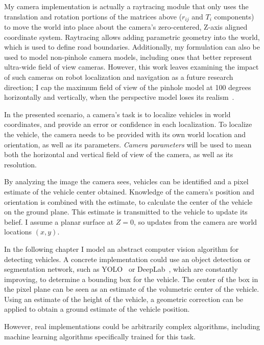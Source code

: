 \documentclass[a4paper,12pt,twoside,openright]{report}
\begin{document}
My camera implementation is actually a raytracing module that only uses the
translation and rotation portions of the matrices above ($r_{ij}$ and $T_i$ components) to
move the world into place about the camera's zero-centered, Z-axis aligned coordinate system. Raytracing
allows adding parametric geometry into the world, which is used to define road boundaries. 
Additionally, my formulation can also be used to model non-pinhole camera models,
including ones that better represent ultra-wide field of view cameras. However, this work leaves
examining the impact of such cameras on robot localization and navigation as
a future research direction; I cap the maximum field of view of the pinhole model
at 100 degrees horizontally and vertically, when the perspective model
loses its realism~\cite{fleckperspective}.

In the presented scenario, a camera's task is to localize vehicles in world coordinates, and
provide an error or confidence in each localization. To localize the vehicle, the camera needs to
be provided with its own world location and orientation, as well as its parameters.
\textit{Camera parameters} will be used to mean both the horizontal
and vertical field of view of the camera, as well as its resolution. 

By analyzing the image the camera sees, vehicles can be identified and a 
pixel estimate of the vehicle center obtained. Knowledge of the camera's position
and orientation is combined with the estimate, to calculate the center of the vehicle
on the ground plane. This estimate is transmitted to the vehicle to update its
belief. I assume a planar surface at $Z = 0$, so updates from the camera
are world locations $(x,y)$.

In the following chapter I model an abstract computer vision algorithm for detecting vehicles. A 
concrete implementation could use an object detection or segmentation network,
such as YOLO~\cite{redmon2018yolov3} or DeepLab~\cite{chen2017rethinking}, which are constantly
improving, to determine a bounding box for the vehicle. The center of the box in the pixel plane
can be seen as an estimate of the volumetric center of the vehicle. 
Using an estimate of the height of the vehicle, a geometric correction can be applied 
to obtain a ground estimate of the vehicle position. %

However, real implementations could be arbitrarily complex algorithms, including
machine learning algorithms specifically trained for this task.
\end{document}
